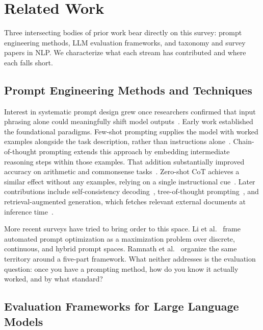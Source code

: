 \documentclass[journal]{IEEEtran}
\begin{document}
\section{Related Work}
\label{sec:related_work}

Three intersecting bodies of prior work bear directly on this survey:
prompt engineering methods, LLM evaluation frameworks, and taxonomy
and survey papers in NLP. We characterize what each stream has
contributed and where each falls short.

\subsection{Prompt Engineering Methods and Techniques}

Interest in systematic prompt design grew once researchers confirmed that
input phrasing alone could meaningfully shift model outputs~\cite{brown2020gpt3}. Early
work established the foundational paradigms. Few-shot prompting supplies the model
with worked examples alongside the task description, rather than instructions alone~\cite{brown2020gpt3}.
Chain-of-thought prompting extends this approach by embedding intermediate reasoning
steps within those examples. That addition substantially improved
accuracy on arithmetic and commonsense tasks~\cite{wei2022chain}. Zero-shot
CoT achieves a similar effect without any examples, relying on
a single instructional cue~\cite{kojima2022large}. Later contributions include
self-consistency decoding~\cite{wang2023selfconsistency}, tree-of-thought
prompting~\cite{yao2023tree}, and retrieval-augmented generation, which
fetches relevant external documents at inference time~\cite{lewis2020retrieval}.

More recent surveys have tried to bring order to this space. Li
et al.~\cite{li2025autoprompt} frame automated prompt optimization as a
maximization problem over discrete, continuous, and hybrid prompt spaces.
Ramnath et al.~\cite{ramnath2025apo} organize the same territory around
a five-part framework. What neither addresses is the evaluation question:
once you have a prompting method, how do you know it actually worked,
and by what standard?~\cite{schulhoff2024prompt,sahoo2024systematic}

\subsection{Evaluation Frameworks for Large Language Models}
\end{document}
